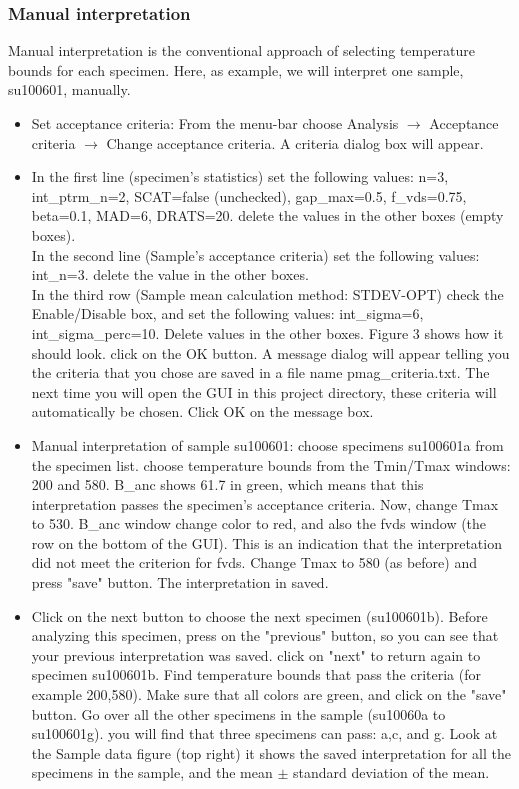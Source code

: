 \documentclass[12pt]{article}
\begin{document}
\subsubsection{Manual interpretation}
Manual interpretation is the conventional approach of selecting temperature bounds for each specimen. Here, as example, we will interpret one sample, su100601,  manually.
\begin{itemize}
\item Set acceptance criteria: From the menu-bar choose  Analysis $\rightarrow$ Acceptance criteria $\rightarrow$ Change acceptance criteria. A criteria dialog box will appear.
\item In the first line (specimen's statistics) set the following values: n=3, int\_ptrm\_n=2, SCAT=false (unchecked), gap\_max=0.5, f\_vds=0.75, beta=0.1, MAD=6, DRATS=20. delete the values in the other boxes (empty boxes). \\
In the second line (Sample's acceptance criteria) set the following values: int\_n=3. delete the value in the other boxes.\\
In the third row (Sample mean calculation method: STDEV-OPT) check the Enable/Disable box, and set the following values: int\_sigma=6, int\_sigma\_perc=10. Delete values in the other boxes. Figure 3 shows how it should look. click on the OK button. A message dialog will appear telling you the criteria that you chose are saved in a file name pmag\_criteria.txt. The next time you will open the GUI in this project directory, these criteria will automatically be chosen. Click OK on the message box.
\item Manual interpretation of sample su100601: choose specimens su100601a from the specimen list. choose temperature bounds from the Tmin/Tmax windows: 200 and 580. B\_anc shows 61.7 in green, which means that this interpretation passes the specimen's acceptance criteria. Now, change Tmax to 530.  B\_anc window change color to red, and also the fvds window (the row on the bottom of the GUI). This is an indication that the interpretation did not meet the criterion for fvds. Change  Tmax to 580 (as before) and press "save" button. The interpretation in saved. 
\item Click on the next button to choose the next specimen (su100601b). Before analyzing this specimen, press on the "previous" button, so you can see that your previous interpretation was saved. click on "next" to return again to specimen su100601b. Find  temperature bounds that pass the criteria (for example 200,580). Make sure that all colors are green, and click on the "save" button. Go over all the other specimens in the sample (su10060a to su100601g). you will find that three specimens can pass: a,c, and g. Look at the Sample data figure (top right) it shows the saved interpretation for all the specimens in the sample, and the mean $\pm$  standard deviation of the mean. 

\end{itemize}
\end{document}
